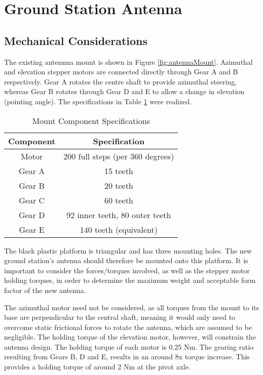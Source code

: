 \graphicspath{{./figures}}

\section{Ground Station Antenna}
\subsection{Mechanical Considerations}

The existing antennna mount is shown in Figure \ref{fig:antennaMount}. Azimuthal and elevation stepper motors are connected directly through Gear A and B respectively. Gear A rotates the centre shaft to provide azimuthal steering, whereas Gear B rotates through Gear D and E to allow a change in elevation (pointing angle). The 
specifications in Table \ref{tab:mount_specifications} were realized.

\begin{table}[!htb]
  \centering
  \renewcommand{\arraystretch}{1.2}
  \begin{tabular}{ |c|c| }
  \hline
  \textbf{Component}        & \textbf{Specification}    \\
  \hline
  Motor         & 200 full steps (per 360 degrees) \\ \hline
  Gear A        & 15 teeth \\ \hline
  Gear B        & 20 teeth \\ \hline
  Gear C        & 60 teeth \\ \hline
  Gear D        & 92 inner teeth, 80 outer teeth \\ \hline
  Gear E        & 140 teeth (equivalent) \\ \hline
  \end{tabular}
  \caption{Mount Component Specifications}
  \label{tab:mount_specifications}
\end{table}

The black plastic platform is triangular and has three mounting holes. The new ground station's antenna should therefore be mounted onto this platform. It is important to consider the forces/torques involved, as well as the stepper motor holding torques, in order to determine the maximum weight and acceptable form factor of the new antenna.

The azimuthal motor need not be considered, as all torques from the mount to its base are perpendicular to the central shaft, meaning it would only need to overcome static frictional forces to rotate the antenna, which are assumed to be negligible. The holding torque of the elevation motor, however, will constrain the antenna design. The holding torque of each motor is 0.25 Nm. The gearing ratio resulting from Gears B, D and E, results in an around 8x torque increase. This provides a holding torque of around 2 Nm at the pivot axle.

